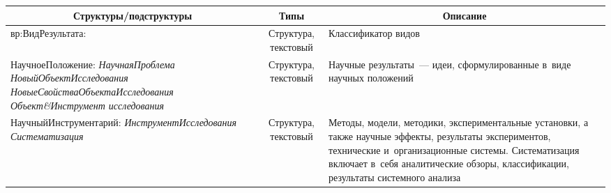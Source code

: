 \begin{multicols}{2}
\begin{table*}\small %
\begin{center}
\vspace*{2ex}

\begin{tabular}{|p{53mm}|c|p{65mm}|}
\hline
\multicolumn{1}{|c|}{Структуры/подструктуры}&Типы&\multicolumn{1}{c|}{Описание}\\
\hline
вр:ВидРезультата:&Структура, текстовый&Классификатор видов\\
\hline
  НаучноеПоложение:\newline
   \textit{НаучнаяПроблема}\newline
   \textit{   НовыйОбъектИсследования}\newline
\textit{НовыеСвойстваОбъектаИсследования}\newline
     \textit{ Объект\&Инструмент исследования}&Структура, текстовый&Научные 
результаты~--- идеи, сформулированные в~виде научных положений\\
\hline
  НаучныйИнструментарий: \newline
   \textit{ИнструментИсследования}\newline
   \textit{Систематизация}\newline&Структура, текстовый&Методы, модели, методики, 
экспериментальные установки, а также научные эффекты, результаты экспериментов, 
технические и~организационные системы. Систематизация включает в~себя аналитические 
обзоры, классификации, результаты системного анализа\\
\hline
\end{tabular}
\end{center}
\end{table*}



\end{multicols}
